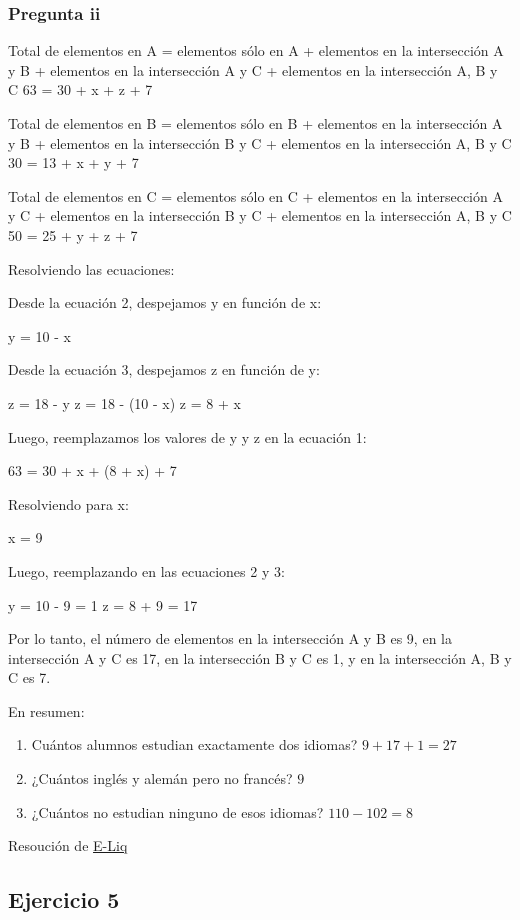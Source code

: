 \subsubsection{Pregunta ii}

Total de elementos en A = elementos sólo en A + elementos en la intersección A y B + elementos en la intersección A y C + elementos en la intersección A, B y C
63 = 30 + x + z + 7

Total de elementos en B = elementos sólo en B + elementos en la intersección A y B + elementos en la intersección B y C + elementos en la intersección A, B y C
30 = 13 + x + y + 7

Total de elementos en C = elementos sólo en C + elementos en la intersección A y C + elementos en la intersección B y C + elementos en la intersección A, B y C
50 = 25 + y + z + 7

Resolviendo las ecuaciones:

Desde la ecuación 2, despejamos y en función de x:

y = 10 - x

Desde la ecuación 3, despejamos z en función de y:

z = 18 - y
z = 18 - (10 - x)
z = 8 + x

Luego, reemplazamos los valores de y y z en la ecuación 1:

63 = 30 + x + (8 + x) + 7

Resolviendo para x:

x = 9

Luego, reemplazando en las ecuaciones 2 y 3:

y = 10 - 9 = 1
z = 8 + 9 = 17

Por lo tanto, el número de elementos en la intersección A y B es 9, en la intersección A y C es 17, en la intersección B y C es 1, y en la intersección A, B y C es 7.

En resumen:
\begin{enumerate}
    \item Cuántos alumnos estudian exactamente dos idiomas? $9+17+1=27$
    \item ¿Cuántos inglés y alemán pero no francés? $9$
    \item ¿Cuántos no estudian ninguno de esos idiomas? $110-102 = 8$
\end{enumerate}

Resoución de \href{https://github.com/E-Liq}{E-Liq}

\subsection{Ejercicio 5}

